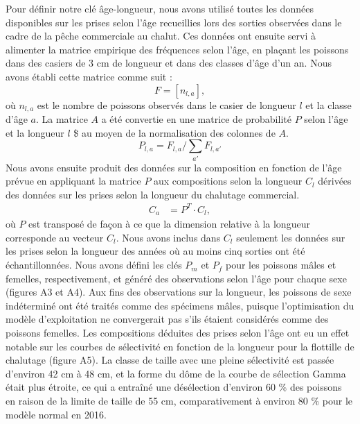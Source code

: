 \documentclass[11pt]{book}
\begin{document}
Pour définir notre clé âge-longueur, nous avons utilisé toutes les données disponibles sur les prises selon l'âge recueillies lors des sorties observées dans le cadre de la pêche commerciale au chalut. Ces données ont ensuite servi à alimenter la matrice empirique des fréquences selon l'âge, en plaçant les poissons dans des casiers de 3 cm de longueur et dans des classes d'âge d'un an. Nous avons établi cette matrice comme suit : \begin{equation}
F = \left[ n_{l,a} \right],
\end{equation} où \(n_{l,a}\) est le nombre de poissons observés dans le casier de longueur \(l\) et la classe d'âge \(a\). La matrice \(A\) a été convertie en une matrice de probabilité \(P\) selon l'âge et la longueur \(l\) \$ au moyen de la normalisation des colonnes de \(A\). \begin{equation}
P_{l,a} = F_{l,a} / \sum_{a'} F_{l,a'}
\end{equation}
Nous avons ensuite produit des données sur la composition en fonction de l'âge prévue en appliquant la matrice \(P\) aux compositions selon la longueur \(C_l\) dérivées des données sur les prises selon la longueur du chalutage commercial. \begin{align}
C_a &= P^T \cdot C_l,
\end{align} où \(P\) est transposé de façon à ce que la dimension relative à la longueur corresponde au vecteur \(C_l\). Nous avons inclus dans \(C_l\) seulement les données sur les prises selon la longueur des années où au moins cinq sorties ont été échantillonnées. Nous avons défini les clés \(P_m\) et \(P_f\) pour les poissons mâles et femelles, respectivement, et généré des observations selon l'âge pour chaque sexe (figures A3 et A4). Aux fins des observations sur la longueur, les poissons de sexe indéterminé ont été traités comme des spécimens mâles, puisque l'optimisation du modèle d'exploitation ne convergerait pas s'ils étaient considérés comme des poissons femelles.
Les compositions déduites des prises selon l'âge ont eu un effet notable sur les courbes de sélectivité en fonction de la longueur pour la flottille de chalutage (figure A5). La classe de taille avec une pleine sélectivité est passée d'environ 42 cm à 48 cm, et la forme du dôme de la courbe de sélection Gamma était plus étroite, ce qui a entraîné une désélection d'environ 60 \% des poissons en raison de la limite de taille de 55 cm, comparativement à environ 80 \% pour le modèle normal en 2016.
\end{document}

